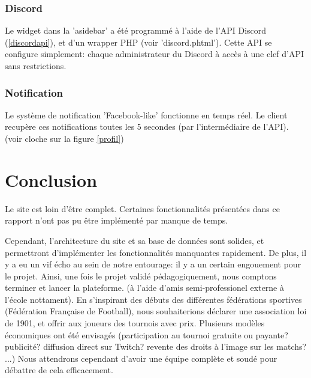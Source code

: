 \documentclass[10pt]{article}
\begin{document}
      \subsubsection{Discord}
	Le widget dans la 'asidebar' a été programmé à l'aide de l'API Discord (\ref{discordapi}), et d'un wrapper PHP (voir 'discord.phtml').
	Cette API se configure simplement: chaque administrateur du Discord à accès à une clef d'API sans restrictions.
	
      \subsubsection{Notification}
	Le système de notification 'Facebook-like' fonctionne en temps réel.
	Le client recupère ces notifications toutes les 5 secondes (par l'intermédiaire de l'API).
	(voir cloche sur la figure \ref{profil})

  \section{Conclusion}
    Le site est loin d'être complet. Certaines fonctionnalités présentées dans ce rapport n'ont pas pu être implémenté par manque de temps.

    Cependant, l'architecture du site et sa base de données sont solides, et permettront d'implémenter les fonctionnalités manquantes rapidement.
    \newline
    \newline
    De plus, il y a eu un vif écho au sein de notre entourage: il y a un certain engouement pour le projet.
    Ainsi, une fois le projet validé pédagogiquement, nous comptons terminer et lancer la plateforme.
    (à l'aide d'amis semi-professionel externe à l'école nottament).
    \newline
    \newline
    En s'inspirant des débuts des différentes fédérations sportives (Fédération Française de Football),
    nous souhaiterions déclarer une association loi de 1901, et offrir aux joueurs des tournois avec prix.
        \newline
    \newline
    Plusieurs modèles économiques ont été envisagés (participation au tournoi gratuite ou payante? publicité? diffusion direct sur Twitch? revente des droits à l'image sur les matchs? ...)
    \newline
    \newline
    Nous attendrons cependant d'avoir une équipe complète et soudé pour débattre de cela efficacement.
  
\end{document}
